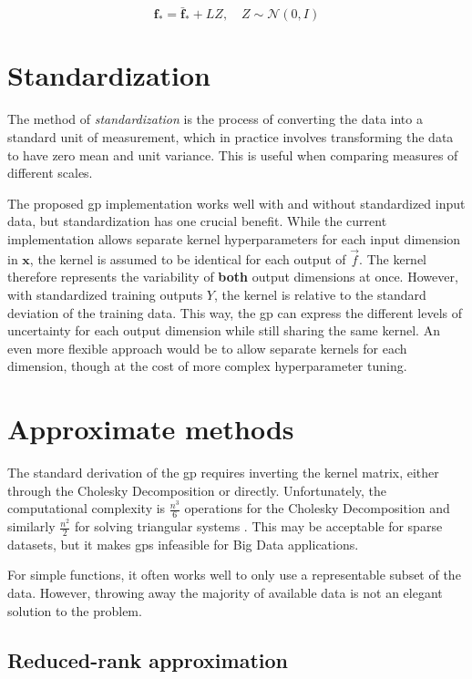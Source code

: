 \begin{equation}
    \boldsymbol{f}_* = \bar{\boldsymbol{f}}_* + L Z, \quad Z \sim \mathcal{N}(0, I)
\end{equation}

\section{Standardization}
The method of \textit{standardization} is the process of converting the data into a standard unit of measurement, which in practice involves transforming the data to have zero mean and unit variance. This is useful when comparing measures of different scales.

The proposed \acrshort{gp} implementation works well with and without standardized input data, but standardization has one crucial benefit. While the current implementation allows separate kernel hyperparameters for each input dimension in $\boldsymbol{x}$, the kernel is assumed to be identical for each output of $\vec{f}$. The kernel therefore represents the variability of \textbf{both} output dimensions at once. However, with standardized training outputs $Y$, the kernel is relative to the standard deviation of the training data. This way, the \acrshort{gp} can express the different levels of uncertainty for each output dimension while still sharing the same kernel. An even more flexible approach would be to allow separate kernels for each dimension, though at the cost of more complex hyperparameter tuning.

\section{Approximate methods}
The standard derivation of the \acrshort{gp} requires inverting the kernel matrix, either through the Cholesky Decomposition or directly. Unfortunately, the computational complexity is $\frac{n^3}{6}$ operations for the Cholesky Decomposition and similarly $\frac{n^2}{2}$ for solving triangular systems \cite{rasmussen}. This may be acceptable for sparse datasets, but it makes \acrshort{gp}s infeasible for Big Data applications. 

For simple functions, it often works well to only use a representable subset of the data. However, throwing away the majority of available data is not an elegant solution to the problem. 

\subsection{Reduced-rank approximation}

